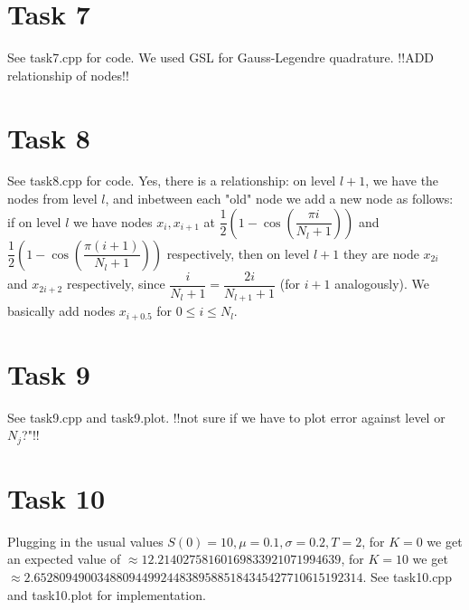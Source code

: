 \documentclass[]{article}
\begin{document}
\section*{Task 7}
See task7.cpp for code. We used GSL for Gauss-Legendre quadrature. !!ADD relationship of nodes!!

\section*{Task 8}
See task8.cpp for code. Yes, there is a relationship: on level $l+1$, we have the nodes from level $l$, and inbetween each "old" node we add a new node as follows: if on level $l$ we have nodes $x_i,x_{i+1}$ at $\dfrac{1}{2}(1-\cos(\dfrac{\pi i}{N_l+1}))$ and $\dfrac{1}{2}(1-\cos(\dfrac{\pi(i+1)}{N_l+1}))$ respectively, then on level $l+1$ they are node $x_{2i}$ and $x_{2i+2}$ respectively, since $\dfrac{i}{N_l+1}=\dfrac{2i}{N_{l+1}+1}$ (for $i+1$ analogously). We basically add nodes  $x_{i+0.5}$ for $0\le i \le N_l$.

\section*{Task 9}
See task9.cpp and task9.plot. !!not sure if we have to plot error against level or $N_j$?"!!

\section*{Task 10}
Plugging in the usual values $S(0)=10,\mu=0.1,\sigma=0.2,T=2$, for $K=0$ we get an expected value of $\approx 12.21402758160169833921071994639$, for $K=10$ we get $\approx 2.6528094900348809449924483895885184345427710615192314$. See task10.cpp and task10.plot for implementation.
\end{document}
